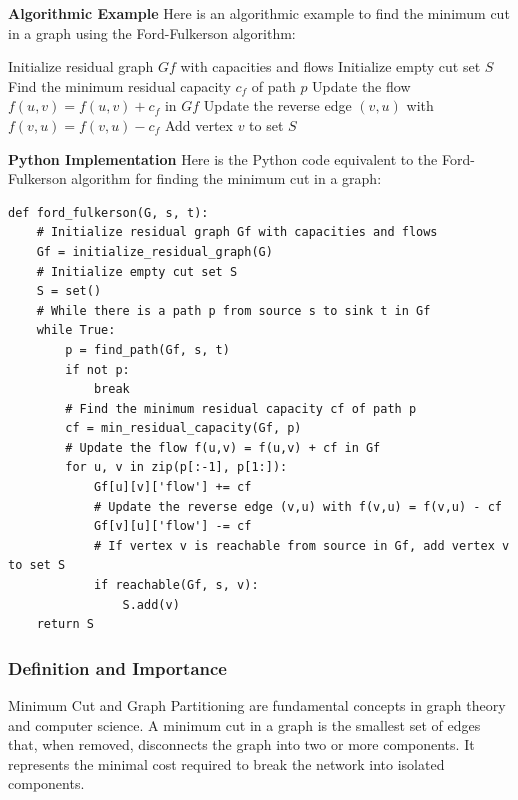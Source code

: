 \documentclass[12pt]{book} %
\begin{document}
\textbf{Algorithmic Example}
\FloatBarrier
Here is an algorithmic example to find the minimum cut in a graph using the Ford-Fulkerson algorithm:
\FloatBarrier
\begin{algorithm}
\caption{Ford-Fulkerson Algorithm for Minimum Cut}
\begin{algorithmic}
\State Initialize residual graph $Gf$ with capacities and flows
\State Initialize empty cut set $S$
    \State Find the minimum residual capacity $c_f$ of path $p$
        \State Update the flow $f(u,v) = f(u,v) + c_f$ in $Gf$
        \State Update the reverse edge $(v,u)$ with $f(v,u) = f(v,u) - c_f$
            \State Add vertex $v$ to set $S$
        \EndIf
    \EndFor
\EndWhile
\end{algorithmic}
\end{algorithm}
\FloatBarrier
\textbf{Python Implementation}
\FloatBarrier
Here is the Python code equivalent to the Ford-Fulkerson algorithm for finding the minimum cut in a graph:
\FloatBarrier
\begin{lstlisting}
def ford_fulkerson(G, s, t):
    # Initialize residual graph Gf with capacities and flows
    Gf = initialize_residual_graph(G)
    # Initialize empty cut set S
    S = set()
    # While there is a path p from source s to sink t in Gf
    while True:
        p = find_path(Gf, s, t)
        if not p:
            break
        # Find the minimum residual capacity cf of path p
        cf = min_residual_capacity(Gf, p)
        # Update the flow f(u,v) = f(u,v) + cf in Gf
        for u, v in zip(p[:-1], p[1:]):
            Gf[u][v]['flow'] += cf
            # Update the reverse edge (v,u) with f(v,u) = f(v,u) - cf
            Gf[v][u]['flow'] -= cf
            # If vertex v is reachable from source in Gf, add vertex v to set S
            if reachable(Gf, s, v):
                S.add(v)
    return S
\end{lstlisting}

\subsubsection{Definition and Importance}
Minimum Cut and Graph Partitioning are fundamental concepts in graph theory and computer science. A minimum cut in a graph is the smallest set of edges that, when removed, disconnects the graph into two or more components. It represents the minimal cost required to break the network into isolated components.
\end{document}
